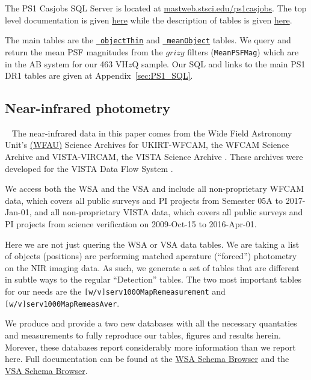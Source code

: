 \documentclass[usenatbib]{mnras}
\begin{document}
The PS1 Casjobs SQL Server is located at
\href{http://mastweb.stsci.edu/ps1casjobs}{mastweb.stsci.edu/ps1casjobs}.
The top level documentation is given
\href{https://outerspace.stsci.edu/display/PANSTARRS/PS1+Source+extraction+and+catalogs}{here}
while the description of tables is given
\href{https://outerspace.stsci.edu/display/PANSTARRS/PS1+Source+extraction+and+catalogs#PS1Sourceextractionandcatalogs}{here}.

The main tables are the
\href{https://outerspace.stsci.edu/display/PANSTARRS/PS1+ObjectThin+table+fields}{{\tt
objectThin}} and
\href{https://outerspace.stsci.edu/display/PANSTARRS/PS1+MeanObject+table+fields}{{\tt
meanObject}} tables.  We query and return the mean PSF magnitudes from
the $grizy$ filters ({\tt MeanPSFMag}) which are in the AB system for
our 463 VH$z$Q sample. Our SQL and links to the main PS1 DR1 tables
are given at  Appendix~\ref{sec:PS1_SQL}.

    
\subsection{Near-infrared photometry}~\label{sec:NIR_data} 
The near-infrared data in this paper comes from the Wide Field
Astronomy Unit's \href{https://www.roe.ac.uk/ifa/wfau/}{(WFAU)}
Science Archives for UKIRT-WFCAM, the WFCAM Science Archive
\citep[WSA; ][]{Hambly2008} and VISTA-VIRCAM, the VISTA Science
Archive \citep[VSA; ][]{Cross2012}. These archives were developed for
the VISTA Data Flow System \citep[VDFS][]{VDFS}.

We access both the WSA and the VSA and include all non-proprietary
WFCAM data, which covers all public surveys and PI projects from
Semester 05A to 2017-Jan-01, and all non-proprietary VISTA data, which
covers all public surveys and PI projects from science verification on
2009-Oct-15 to 2016-Apr-01.

Here we are not just quering the WSA or VSA data tables. We are taking
a list of objects (positions) are performing matched aperature
(``forced'') photometry on the NIR imaging data. As such, we generate
a set of tables that are different in subtle ways to the regular
``Detection'' tables.  The two most important tables for our needs are
the {\tt [w/v]serv1000MapRemeasurement} and {\tt
[w/v]serv1000MapRemeasAver}.

We produce and provide a two new databases with all the necessary
quantaties and measurements to fully reproduce our tables, figures and
results herein. Morever, these databases report considerably more
information than we report here. Full documentation can be found at
the \href{http://wsa.roe.ac.uk/www/wsa_browser.html}{WSA Schema
Browser} and the
\href{http://horus.roe.ac.uk/vsa/www/vsa_browser.html}{VSA Schema
Browser}.
\end{document}
